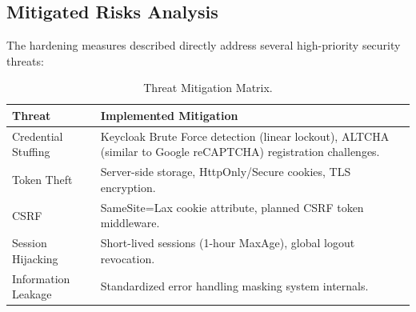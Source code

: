 \subsection{Mitigated Risks Analysis}

The hardening measures described directly address several high-priority security threats:

\begin{table}[H]
\centering
\begin{tabular}{|l|p{11cm}|}
\hline
\textbf{Threat} & \textbf{Implemented Mitigation} \\ \hline
Credential Stuffing & Keycloak Brute Force detection (linear lockout), ALTCHA (similar to Google reCAPTCHA) registration challenges.\\ \hline
Token Theft & Server-side storage, HttpOnly/Secure cookies, TLS encryption. \\ \hline
\ac{CSRF} & SameSite=Lax cookie attribute, planned CSRF token middleware. \\ \hline
Session Hijacking & Short-lived sessions (1-hour MaxAge), global logout revocation. \\ \hline
Information Leakage & Standardized error handling masking system internals. \\ \hline
\end{tabular}
\caption{Threat Mitigation Matrix.}
\label{tab:mitigation-matrix}
\end{table}



